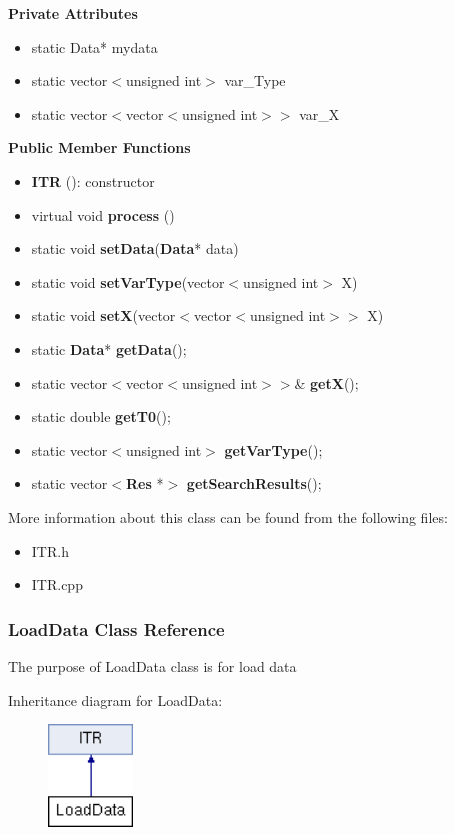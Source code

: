 \documentclass{article}
\begin{document}
\textbf{Private Attributes}
\begin{itemize}
\item static Data* mydata                 
\item static vector$<$unsigned int$>$ var\_Type   
\item static vector$<$vector$<$unsigned int$>>$ var\_X
\end{itemize}



\textbf{Public Member Functions}
\begin{itemize}
\item \textbf{ITR} (): constructor
\item virtual void \textbf{process} ()  
\item static void \textbf{setData}(\textbf{Data}* data)                  
\item static void \textbf{setVarType}(vector$<$unsigned int$>$ X)          
\item static void \textbf{setX}(vector$<$vector$<$unsigned int$>>$ X)       
\item static \textbf{Data}* \textbf{getData}();                      
\item static vector$<$vector$<$unsigned int$>>$\& \textbf{getX}(); 
\item static double \textbf{getT0}();                       
\item static vector$<$unsigned int$>$ \textbf{getVarType}();    
\item static vector$<$\textbf{Res} *$>$ \textbf{getSearchResults}(); 
\end{itemize}







More information about this class can be found from the following files:
\begin{itemize}
\item ITR.h
\item ITR.cpp
\end{itemize}


\subsubsection{LoadData Class Reference}
The purpose of LoadData class is for load data

Inheritance diagram for LoadData:
\begin{figure}[H]
\centering
\includegraphics[width=0.2\textwidth]{class_load_data.png}
\end{figure}
\end{document}
